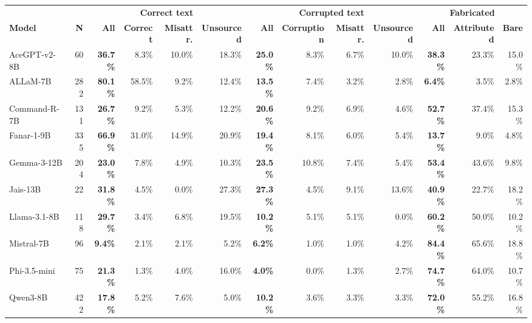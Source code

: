 \begin{table}[t]
\centering
\scriptsize
\setlength{\tabcolsep}{1.5pt}
\renewcommand{\arraystretch}{1.15}
\begin{tabular}{l r @{\hspace{6pt}} rrrr @{\hspace{6pt}} rrrr @{\hspace{6pt}} rrr}
\toprule
 &  & \multicolumn{4}{c}{\textbf{Correct text}} & \multicolumn{4}{c}{\textbf{Corrupted text}} & \multicolumn{3}{c}{\textbf{Fabricated}} \\
\cmidrule(lr){3-6}\cmidrule(lr){7-10}\cmidrule(lr){11-13}
\textbf{Model} & \textbf{N} & \textbf{All} & \textbf{Correct} & \textbf{Misattr.} & \textbf{Unsourced} & \textbf{All} & \textbf{Corruption} & \textbf{Misattr.} & \textbf{Unsourced} & \textbf{All} & \textbf{Attributed} & \textbf{Bare} \\
\midrule
AceGPT-v2-8B & 60 & \textbf{36.7\%} & 8.3\% & 10.0\% & 18.3\% & \textbf{25.0\%} & 8.3\% & 6.7\% & 10.0\% & \textbf{38.3\%} & 23.3\% & 15.0\% \\
ALLaM-7B & 282 & \textbf{80.1\%} & 58.5\% & 9.2\% & 12.4\% & \textbf{13.5\%} & 7.4\% & 3.2\% & 2.8\% & \textbf{6.4\%} & 3.5\% & 2.8\% \\
Command-R-7B & 131 & \textbf{26.7\%} & 9.2\% & 5.3\% & 12.2\% & \textbf{20.6\%} & 9.2\% & 6.9\% & 4.6\% & \textbf{52.7\%} & 37.4\% & 15.3\% \\
Fanar-1-9B & 335 & \textbf{66.9\%} & 31.0\% & 14.9\% & 20.9\% & \textbf{19.4\%} & 8.1\% & 6.0\% & 5.4\% & \textbf{13.7\%} & 9.0\% & 4.8\% \\
Gemma-3-12B & 204 & \textbf{23.0\%} & 7.8\% & 4.9\% & 10.3\% & \textbf{23.5\%} & 10.8\% & 7.4\% & 5.4\% & \textbf{53.4\%} & 43.6\% & 9.8\% \\
Jais-13B & 22 & \textbf{31.8\%} & 4.5\% & 0.0\% & 27.3\% & \textbf{27.3\%} & 4.5\% & 9.1\% & 13.6\% & \textbf{40.9\%} & 22.7\% & 18.2\% \\
Llama-3.1-8B & 118 & \textbf{29.7\%} & 3.4\% & 6.8\% & 19.5\% & \textbf{10.2\%} & 5.1\% & 5.1\% & 0.0\% & \textbf{60.2\%} & 50.0\% & 10.2\% \\
Mistral-7B & 96 & \textbf{9.4\%} & 2.1\% & 2.1\% & 5.2\% & \textbf{6.2\%} & 1.0\% & 1.0\% & 4.2\% & \textbf{84.4\%} & 65.6\% & 18.8\% \\
Phi-3.5-mini & 75 & \textbf{21.3\%} & 1.3\% & 4.0\% & 16.0\% & \textbf{4.0\%} & 0.0\% & 1.3\% & 2.7\% & \textbf{74.7\%} & 64.0\% & 10.7\% \\
Qwen3-8B & 422 & \textbf{17.8\%} & 5.2\% & 7.6\% & 5.0\% & \textbf{10.2\%} & 3.6\% & 3.3\% & 3.3\% & \textbf{72.0\%} & 55.2\% & 16.8\% \\

\end{tabular}
\end{table}
